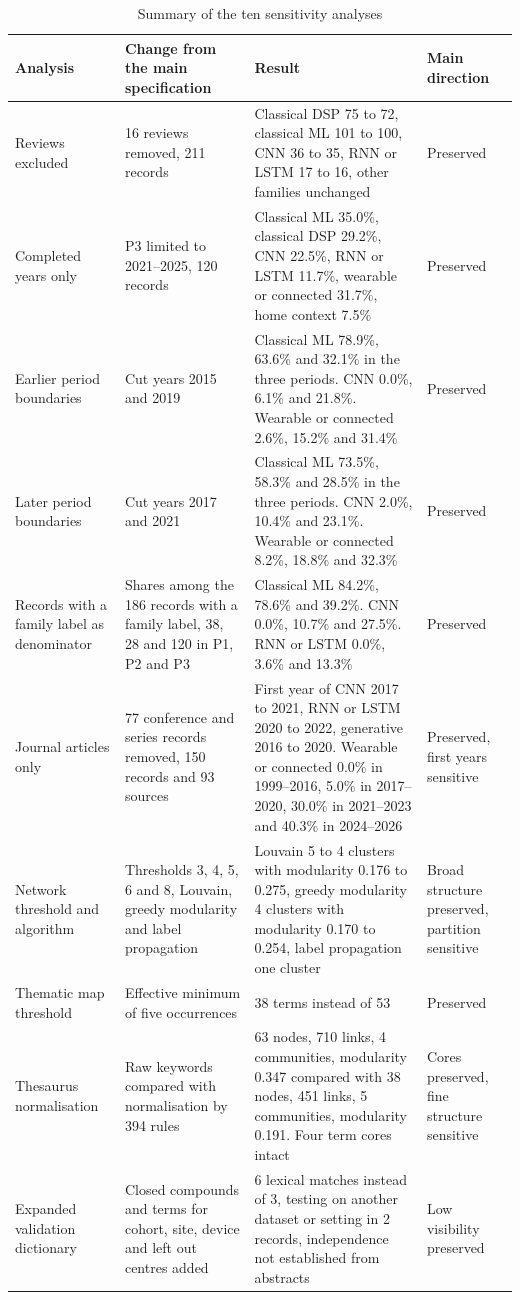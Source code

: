 \begin{table}[!t]
\caption{Summary of the ten sensitivity analyses}
\label{tab:sens}
\centering
\footnotesize
\begin{tabularx}{\textwidth}{@{}L{3.8cm}L{4.3cm}YL{2.6cm}@{}}
\toprule
Analysis & Change from the main specification & Result & Main direction \\
\midrule
Reviews excluded & 16 reviews removed, 211 records & Classical DSP 75 to 72, classical ML 101 to 100, CNN 36 to 35, RNN or LSTM 17 to 16, other families unchanged & Preserved \\
Completed years only & P3 limited to 2021--2025, 120 records & Classical ML 35.0\%, classical DSP 29.2\%, CNN 22.5\%, RNN or LSTM 11.7\%, wearable or connected 31.7\%, home context 7.5\% & Preserved \\
Earlier period boundaries & Cut years 2015 and 2019 & Classical ML 78.9\%, 63.6\% and 32.1\% in the three periods. CNN 0.0\%, 6.1\% and 21.8\%. Wearable or connected 2.6\%, 15.2\% and 31.4\% & Preserved \\
Later period boundaries & Cut years 2017 and 2021 & Classical ML 73.5\%, 58.3\% and 28.5\% in the three periods. CNN 2.0\%, 10.4\% and 23.1\%. Wearable or connected 8.2\%, 18.8\% and 32.3\% & Preserved \\
Records with a family label as denominator & Shares among the 186 records with a family label, 38, 28 and 120 in P1, P2 and P3 & Classical ML 84.2\%, 78.6\% and 39.2\%. CNN 0.0\%, 10.7\% and 27.5\%. RNN or LSTM 0.0\%, 3.6\% and 13.3\% & Preserved \\
Journal articles only & 77 conference and series records removed, 150 records and 93 sources & First year of CNN 2017 to 2021, RNN or LSTM 2020 to 2022, generative 2016 to 2020. Wearable or connected 0.0\% in 1999--2016, 5.0\% in 2017--2020, 30.0\% in 2021--2023 and 40.3\% in 2024--2026 & Preserved, first years sensitive \\
Network threshold and algorithm & Thresholds 3, 4, 5, 6 and 8, Louvain, greedy modularity and label propagation & Louvain 5 to 4 clusters with modularity 0.176 to 0.275, greedy modularity 4 clusters with modularity 0.170 to 0.254, label propagation one cluster & Broad structure preserved, partition sensitive \\
Thematic map threshold & Effective minimum of five occurrences & 38 terms instead of 53 & Preserved \\
Thesaurus normalisation & Raw keywords compared with normalisation by 394 rules & 63 nodes, 710 links, 4 communities, modularity 0.347 compared with 38 nodes, 451 links, 5 communities, modularity 0.191. Four term cores intact & Cores preserved, fine structure sensitive \\
Expanded validation dictionary & Closed compounds and terms for cohort, site, device and left out centres added & 6 lexical matches instead of 3, testing on another dataset or setting in 2 records, independence not established from abstracts & Low visibility preserved \\
\bottomrule
\end{tabularx}
\end{table}
